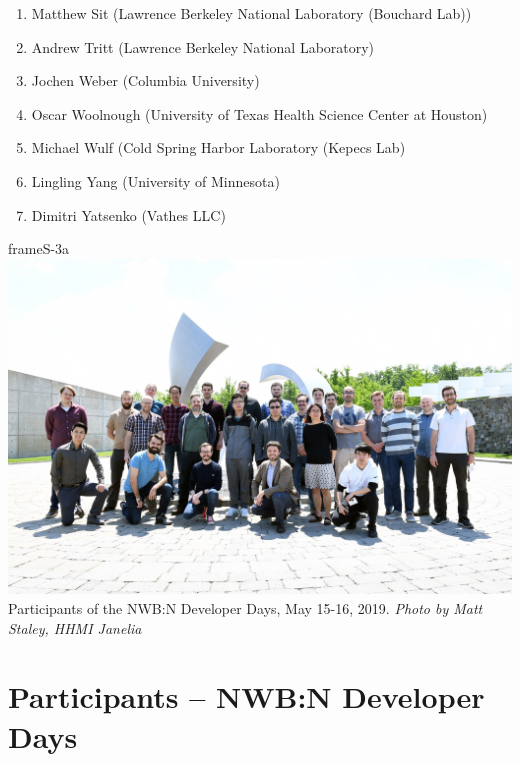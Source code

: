 \documentclass{article}
\begin{document}
\begin{multicols}{2}
\begin{enumerate}[leftmargin=*]
\item Matthew Sit (Lawrence Berkeley National Laboratory (Bouchard Lab))
\item Andrew Tritt (Lawrence Berkeley National Laboratory)
\item Jochen Weber (Columbia University)
\item Oscar Woolnough (University of Texas Health Science Center at Houston)
\item Michael Wulf (Cold Spring Harbor Laboratory (Kepecs Lab)
\item Lingling Yang (University of Minnesota)
\item Dimitri Yatsenko (Vathes LLC)
\end{enumerate}
\end{multicols}
\clearpage

\begin{staticcontents*}{frameS-3a}
\includegraphics[width=\textwidth]{figures/developer_days_group_photo_small.jpg}
Participants of the NWB:N Developer Days, May 15-16, 2019.
\small \textit{Photo by Matt Staley, HHMI Janelia}
\end{staticcontents*}

\section{Participants -- NWB:N Developer Days}
\label{sec:devparticipants}
\end{document}
